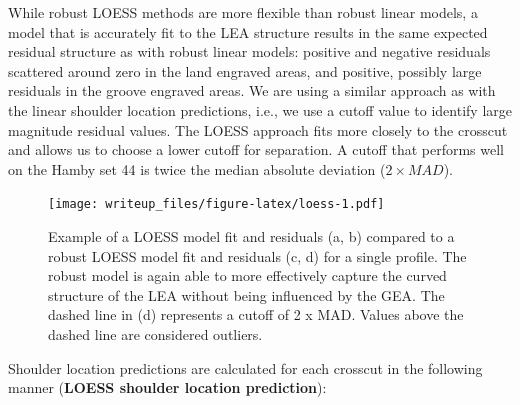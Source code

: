 \documentclass[12pt]{article}
\begin{document}
 While robust LOESS
methods are more flexible than robust linear models, a model that is
accurately fit to the LEA structure  results in the same
expected residual structure as with robust linear models: positive and
negative residuals scattered around zero in the land engraved areas, and
positive, possibly large residuals in the groove engraved areas. We are
using a similar approach as with the linear shoulder location
predictions, i.e., we use a cutoff value to identify large magnitude
residual values. The LOESS approach fits more closely to the crosscut
and allows us to choose a lower cutoff for separation. A cutoff that
performs well on the Hamby set 44 is twice the median absolute deviation
(\(2\times MAD\)).

\begin{figure}
\centering
\texttt{[image: writeup\_files/figure-latex/loess-1.pdf]}
\caption{\label{loess}Example of a LOESS model fit and residuals (a, b)
compared to a robust LOESS model fit and residuals (c, d) for a single
profile. The robust model is again able to more effectively capture the
curved structure of the LEA without being influenced by the GEA. The
dashed line in (d) represents a cutoff of 2 x MAD. Values above the
dashed line are considered outliers.}
\end{figure}

Shoulder location predictions are calculated for each crosscut in the
following manner (\textbf{LOESS shoulder location prediction}):
\end{document}
